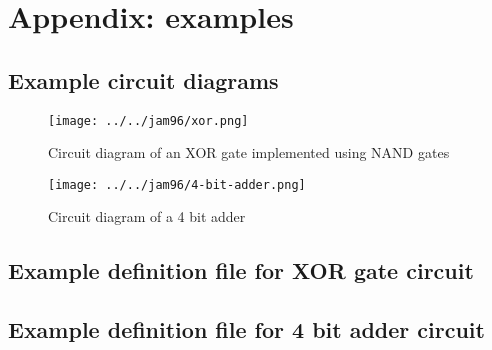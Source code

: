\documentclass[a4paper,10pt]{article}
\begin{document}
\clearpage

\section{Appendix: examples}

\subsection{Example circuit diagrams}
\begin{figure}[h]
 \centering
 \texttt{[image: ../../jam96/xor.png]}
 \caption{Circuit diagram of an XOR gate implemented using NAND gates}
 \label{fig:example-xor}
\end{figure}

\begin{figure}[h]
 \centering
 \texttt{[image: ../../jam96/4-bit-adder.png]}
 \caption{Circuit diagram of a 4 bit adder}
 \label{fig:example-adder}
\end{figure}


\subsection{Example definition file for XOR gate circuit}


\subsection{Example definition file for 4 bit adder circuit}

\end{document}
